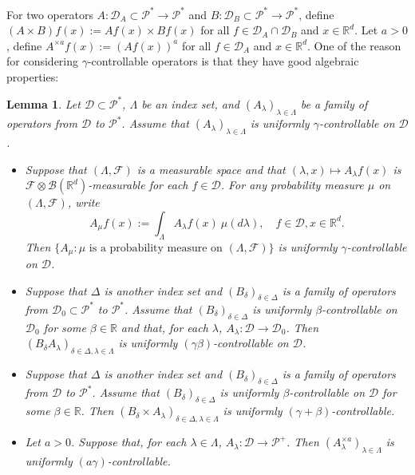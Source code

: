 \documentclass[12pt]{amsart}
\theoremstyle{plain}
\newtheorem{lem}[thm]{Lemma}
\theoremstyle{definition}
\numberwithin{equation}{section}
\begin{document}
	For two operators $A: \mathcal D_A \subset \mathcal P^*\to \mathcal P^*$ and $B: \mathcal D_B \subset \mathcal P^*\to \mathcal P^*$, define $(A\times B)f (x):= Af(x) \times Bf(x)$ for all $f\in \mathcal D_A \cap \mathcal D_B$ and $x\in \mathbb R^d$.
    Let $a > 0$, define $A^{\times a}f(x):= (Af(x))^a$ for all $f\in \mathcal D_A$ and $x\in \mathbb R^d$.
    One of the reason for considering $\gamma$-controllable operators is that they have good algebraic properties:
\begin{lem}
\label{lem: property of controllable operators}
    Let $\mathcal D \subset \mathcal P^*$, $\Lambda$ be an index set, and $(A_\lambda)_{\lambda\in \Lambda}$ be a family of operators from $\mathcal D$ to $ \mathcal P^*$. Assume that $(A_\lambda)_{\lambda\in \Lambda}$ is uniformly $\gamma$-controllable on $\mathcal D$.
\begin{itemize}
\item[(1)]
    Suppose that $(\Lambda, \mathscr F)$ is a measurable space
    and that $(\lambda,x)\mapsto A_\lambda f(x)$ is $\mathscr F \otimes \mathscr B(\mathbb R^d)$-measurable for each $f\in \mathcal D$.
    For any probability measure $\mu$ on $(\Lambda, \mathscr F)$, write
\[
    A_\mu f(x):= \int_{\Lambda} A_\lambda f (x)~\mu(d\lambda), \quad f\in \mathcal D, x\in \mathbb R^d.
\]
    Then  $\{A_\mu: \mu \text{ is  a probability measure on } (\Lambda, \mathscr F)\}$ is uniformly $\gamma$-controllable on $\mathcal D$.
\item[(2)]
    Suppose that $\Delta$ is another index set and $(B_\delta)_{\delta\in \Delta}$ is a family of operators from $\mathcal D_0\subset \mathcal P^*$ to $ \mathcal P^*$.
    Assume that $(B_\delta)_{\delta\in \Delta}$ is uniformly $\beta$-controllable on $\mathcal D_0$ for some $\beta \in \mathbb R$ and that, for each $\lambda$, $A_\lambda:\mathcal D \to \mathcal D_0$.
    Then  $(B_\delta A_\lambda)_{\delta\in \Delta, \lambda \in \Lambda}$ is uniformly $(\gamma\beta)$-controllable on $\mathcal D$.
\item[(3)]
    Suppose that $\Delta$ is another index set and $(B_\delta)_{\delta\in \Delta}$ is a family of operators from $\mathcal D$ to $ \mathcal P^*$.
    Assume that $(B_\delta)_{\delta\in \Delta}$ is uniformly $\beta$-controllable on $\mathcal D$ for some $\beta \in \mathbb R$.
    Then  $(B_\delta\times A_\lambda)_{\delta \in \Delta, \lambda \in \Lambda}$ is uniformly $(\gamma+\beta)$-controllable.
\item[(4)]
    Let $a>0$. Suppose that, for each $\lambda \in \Lambda$, $A_\lambda : \mathcal D \to \mathcal P^+$.
    Then $(A^{\times a}_\lambda)_{\lambda \in \Lambda}$ is uniformly $(a\gamma)$-controllable.
\end{itemize}
\end{lem}
\end{document}
